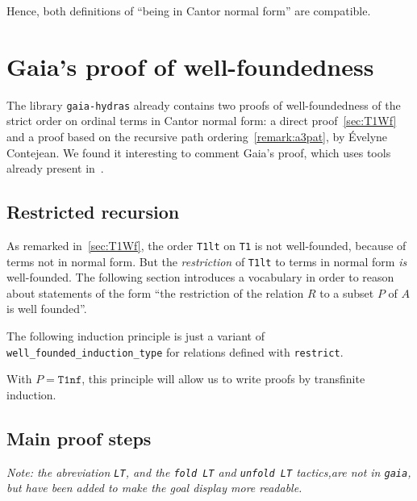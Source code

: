 

Hence, both definitions of ``being in Cantor normal form'' are
compatible.



\section{Gaia's proof of well-foundedness}
The library \texttt{gaia-hydras} already contains two proofs
of well-foundedness of the strict order on ordinal terms in
Cantor normal form: a direct proof~\vref{sec:T1Wf} and a proof based on the recursive path ordering~\vref{remark:a3pat}, by
\'Evelyne Contejean. We found it interesting to comment Gaia's proof, which uses  tools already present in~\cite{CantorContrib}.

\subsection{Restricted recursion}
As remarked in~\vref{sec:T1Wf}, the order \texttt{T1lt} on \texttt{T1} is not well-founded, because of terms not in normal form.
But the \emph{restriction} of \texttt{T1lt} to terms in normal form \emph{is} well-founded. The following section introduces a  vocabulary in order to reason about statements of the form  ``the restriction of the relation $R$ to a subset $P$ of $A$ is well founded''.


The following induction principle is just a variant of \texttt{well\_founded\_induction\_type} for relations defined with \texttt{restrict}.


With $P=\texttt{T1nf}$, this principle will allow us to write proofs by transfinite induction.

\subsection{Main proof steps}

\emph{Note: the abreviation \texttt{LT}, and the \texttt{fold LT} and \texttt{unfold LT} tactics,are not in \texttt{gaia}, but  have been added to make the goal display more readable.}


